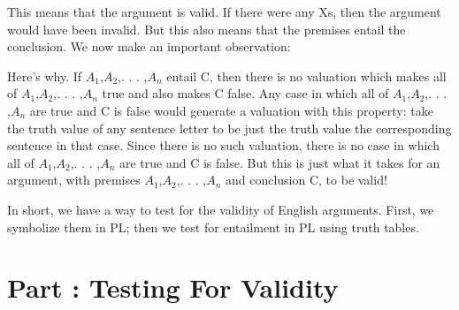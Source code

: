 This means that the argument is valid. If there were any Xs, then the argument would have been invalid. But this also means that the premises entail the conclusion. We now make an important observation:


Here’s why. If $A_1$,$A_2$,. . . ,$A_n$ entail C, then there is no valuation which makes all of $A_1$,$A_2$,. . . ,$A_n$ true and also makes C false. Any case in which all of $A_1$,$A_2$,. . . ,$A_n$ are true and C is false would generate a valuation with this property: take the truth value of any sentence letter to be just the truth value the corresponding sentence in that case. Since there is no such valuation, there is no case in which all of $A_1$,$A_2$,. . . ,$A_n$ are true and C is false. But this is just what it takes for an argument, with premises $A_1$,$A_2$,. . . ,$A_n$ and conclusion C, to be valid!

In short, we have a way to test for the validity of English arguments. First, we symbolize them in PL; then we test for entailment in PL using truth tables.
\setcounter{seccount}{1}
\chapter{Part \thechapcount: Testing For Validity}
